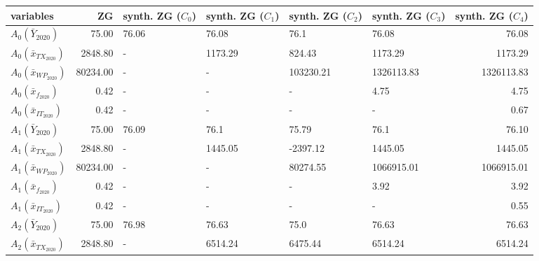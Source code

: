 \begin{tabular}{lrllllr}
\toprule
                    variables &       ZG & synth. ZG ($C_{0}$) & synth. ZG ($C_{1}$) & synth. ZG ($C_{2}$) & synth. ZG ($C_{3}$) &  synth. ZG ($C_{4}$) \\
\midrule
      $A_{0}(\bar{Y}_{2020})$ &    75.00 &               76.06 &               76.08 &                76.1 &               76.08 &                76.08 \\
 $A_{0}(\bar{x}_{TX_{2020}})$ &  2848.80 &                   - &             1173.29 &              824.43 &             1173.29 &              1173.29 \\
 $A_{0}(\bar{x}_{WP_{2020}})$ & 80234.00 &                   - &                   - &           103230.21 &          1326113.83 &           1326113.83 \\
  $A_{0}(\bar{x}_{f_{2020}})$ &     0.42 &                   - &                   - &                   - &                4.75 &                 4.75 \\
 $A_{0}(\bar{x}_{IT_{2020}})$ &     0.42 &                   - &                   - &                   - &                   - &                 0.67 \\
      $A_{1}(\bar{Y}_{2020})$ &    75.00 &               76.09 &                76.1 &               75.79 &                76.1 &                76.10 \\
 $A_{1}(\bar{x}_{TX_{2020}})$ &  2848.80 &                   - &             1445.05 &            -2397.12 &             1445.05 &              1445.05 \\
 $A_{1}(\bar{x}_{WP_{2020}})$ & 80234.00 &                   - &                   - &            80274.55 &          1066915.01 &           1066915.01 \\
  $A_{1}(\bar{x}_{f_{2020}})$ &     0.42 &                   - &                   - &                   - &                3.92 &                 3.92 \\
 $A_{1}(\bar{x}_{IT_{2020}})$ &     0.42 &                   - &                   - &                   - &                   - &                 0.55 \\
      $A_{2}(\bar{Y}_{2020})$ &    75.00 &               76.98 &               76.63 &                75.0 &               76.63 &                76.63 \\
 $A_{2}(\bar{x}_{TX_{2020}})$ &  2848.80 &                   - &             6514.24 &             6475.44 &             6514.24 &              6514.24 \\

\end{tabular}
